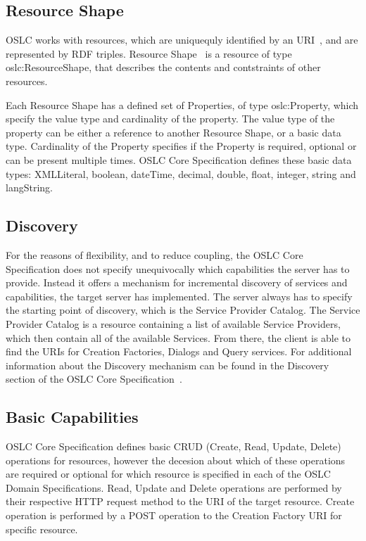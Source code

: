 \subsection*{Resource Shape}
OSLC works with resources, which are uniquequly identified by an URI \cite{uri_rfc}, and are represented by RDF triples. Resource Shape \cite{oslc_core_resource_shape} is a resource of type oslc:ResourceShape, that describes the contents and contstraints of other resources.


Each Resource Shape has a defined set of Properties, of type oslc:Property, which specify the value type and cardinality of the property. The value type of the property can be either a reference to another Resource Shape, or a basic data type. Cardinality of the Property specifies if the Property is required, optional or can be present multiple times. OSLC Core Specification defines these basic data types: XMLLiteral, boolean, dateTime, decimal, double, float, integer, string and langString.

\subsection*{Discovery}
For the reasons of flexibility, and to reduce coupling, the OSLC Core Specification does not specify unequivocally which capabilities the server has to provide. Instead it offers a mechanism for incremental discovery of services and capabilities, the target server has implemented.
The server always has to specify the starting point of discovery, which is the Service Provider Catalog. The Service Provider Catalog is a resource containing a list of available Service Providers, which then contain all of the available Services. From there, the client is able to find the URIs for Creation Factories, Dialogs and Query services. For additional information about the Discovery mechanism can be found in the Discovery section of the OSLC Core Specification \cite{oslc_core_discovery}.

\subsection*{Basic Capabilities}
OSLC Core Specification defines basic CRUD (Create, Read, Update, Delete) operations for resources, however the decesion about which of these operations are required or optional for which resource is specified in each of the OSLC Domain Specifications. Read, Update and Delete operations are performed by their respective HTTP request method to the URI of the target resource. Create operation is performed by a POST operation to the Creation Factory URI for specific resource. 

